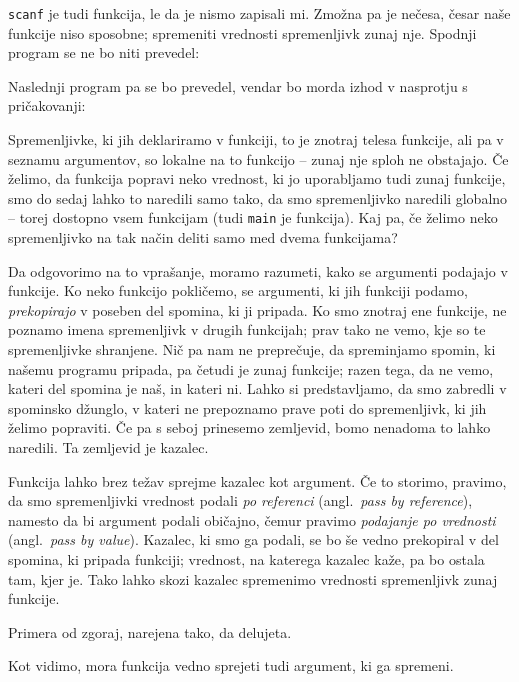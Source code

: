 \documentclass{book}
\begin{document}
\begin{examples}
  \verb+scanf+ je tudi funkcija, le da je nismo zapisali mi.
  Zmožna pa je nečesa, česar naše funkcije niso sposobne; spremeniti vrednosti
  spremenljivk zunaj nje. Spodnji program se ne bo niti prevedel:


  Naslednji program pa se bo prevedel, vendar bo morda izhod v nasprotju s
  pričakovanji:


  \begin{inout}
  \end{inout}
\end{examples}

Spremenljivke, ki jih deklariramo v funkciji, to je znotraj telesa funkcije,
ali pa v seznamu argumentov, so lokalne na to funkcijo -- zunaj nje sploh ne
obstajajo. Če želimo, da funkcija popravi neko vrednost, ki jo uporabljamo tudi
zunaj funkcije, smo do sedaj lahko to naredili samo tako, da smo spremenljivko
naredili globalno -- torej dostopno vsem funkcijam
(tudi \verb+main+ je funkcija). Kaj pa, če želimo neko spremenljivko na tak
način deliti samo med dvema funkcijama?

Da odgovorimo na to vprašanje, moramo razumeti, kako se argumenti podajajo v
funkcije. Ko neko funkcijo pokličemo, se argumenti, ki jih funkciji podamo,
\emph{prekopirajo} v poseben del spomina, ki ji pripada. Ko smo znotraj ene
funkcije, ne poznamo imena spremenljivk v drugih funkcijah; prav tako ne vemo,
kje so te spremenljivke shranjene. Nič pa nam ne preprečuje, da spreminjamo
spomin, ki našemu programu pripada, pa četudi je zunaj funkcije;
razen tega, da ne vemo, kateri del spomina je naš, in kateri ni.
Lahko si predstavljamo, da smo zabredli v spominsko džunglo, v kateri
ne prepoznamo prave poti do spremenljivk, ki jih želimo popraviti. Če pa s seboj
prinesemo zemljevid, bomo nenadoma to lahko naredili. Ta zemljevid je kazalec.

Funkcija lahko brez težav sprejme kazalec kot argument. Če to storimo, pravimo,
da smo spremenljivki vrednost podali \emph{po referenci}
(angl.~\textit{pass by reference}), namesto da bi argument podali običajno,
čemur pravimo \emph{podajanje po vrednosti} (angl.~\textit{pass by value}).
Kazalec, ki smo ga podali, se bo še vedno prekopiral v del spomina, ki pripada
funkciji; vrednost, na katerega kazalec kaže, pa bo ostala tam, kjer je.
Tako lahko skozi kazalec spremenimo vrednosti spremenljivk zunaj funkcije.

\begin{examples}
  Primera od zgoraj, narejena tako, da delujeta.


  Kot vidimo, mora funkcija vedno sprejeti tudi argument, ki ga spremeni.


\end{examples}
\end{document}
